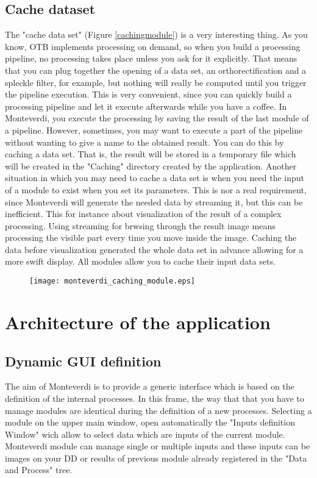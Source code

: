 \documentclass{InsightSoftwareGuide}
\begin{document}
\section{Cache dataset}
The "cache data set" (Figure \ref{cachingmodule}) is a very interesting thing. As you know, OTB implements processing on demand, so when you build a 
processing pipeline, no processing takes place unless you ask for it explicitly. That means that you can plug together
 the opening of a data set, an orthorectification and a spleckle filter, for example, but nothing will really be computed 
until you trigger the pipeline execution. This is very convenient, since you can quickly build a processing pipeline and 
let it execute afterwards while you have a coffee. In Monteverdi, you execute the processing by saving the result of the 
last module of a pipeline. However, sometimes, you may want to execute a part of the pipeline without wanting to give a 
name to the obtained result. You can do this by caching a data set. That is, the result will be stored in a temporary 
file which will be created in the "Caching" directory created by the application. Another situation in which you may need 
to cache a data set is when you need the input of a module to exist when you set its parameters. This is nor a real requirement, 
since Monteverdi will generate the needed data by streaming it, but this can be inefficient. This for instance about visualization
 of the result of a complex processing. Using streaming for brwsing through the result image means processing the visible part 
every time you move inside the image. Caching the data before visualization generated the whole data set in advance allowing 
for a more swift display. All modules allow you to cache their input data sets.

\begin{figure}
   \center
   \texttt{[image: monteverdi\_caching\_module.eps]}
   \label{fig:pixeldescriptioninformations}
\end{figure}

\chapter{Architecture of the application}
\section{Dynamic GUI definition}
The aim of Monteverdi is to provide a generic interface which is based on the definition of the internal processes. 
In this frame, the way that that you have to manage modules are identical during the definition of a new processes.
Selecting a module on the upper main window, open automatically the "Inputs definition Window" wich allow to select data which
are inputs of the current module. Monteverdi module can manage single or multiple inputs and these inputs can be images on your 
DD or results of previous module already registered in the "Data and Process" tree.    
\end{document}
